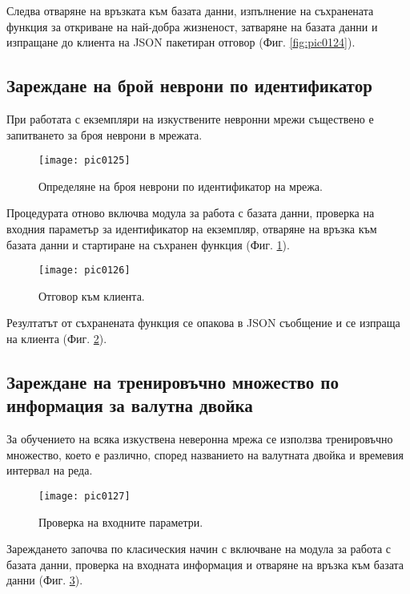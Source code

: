 Следва отваряне на връзката към базата данни, изпълнение на съхранената функция за откриване на най-добра жизненост, затваряне на базата данни и изпращане до клиента на JSON пакетиран отговор (Фиг. \ref{fig:pic0124}).

\subsection{Зареждане на брой неврони по идентификатор}

При работата с екземпляри на изкуствените невронни мрежи съществено е запитването за броя неврони в мрежата. 

\begin{figure}[h]
  \centering
  \texttt{[image: pic0125]}
  \caption{Определяне на броя неврони по идентификатор на мрежа.}
\label{fig:pic0125}
\end{figure}
\FloatBarrier

Процедурата отново включва модула за работа с базата данни, проверка на входния параметър за идентификатор на екземпляр, отваряне на връзка към базата данни и стартиране на съхранен функция (Фиг. \ref{fig:pic0125}).

\begin{figure}[h]
  \centering
  \texttt{[image: pic0126]}
  \caption{Отговор към клиента.}
\label{fig:pic0126}
\end{figure}
\FloatBarrier

Резултатът от съхранената функция се опакова в JSON съобщение и се изпраща на клиента (Фиг. \ref{fig:pic0126}).

\subsection{Зареждане на тренировъчно множество по информация за валутна двойка}

За обучението на всяка изкуствена неверонна мрежа се използва тренировъчно множество, което е различно, според названието на валутната двойка и времевия интервал на реда. 

\begin{figure}[h]
  \centering
  \texttt{[image: pic0127]}
  \caption{Проверка на входните параметри.}
\label{fig:pic0127}
\end{figure}
\FloatBarrier

Зареждането започва по класическия начин с включване на модула за работа с базата данни, проверка на входната информация и отваряне на връзка към базата данни (Фиг. \ref{fig:pic0127}).

